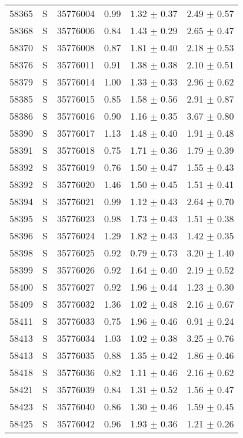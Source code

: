 \begin{longtable*}[c]{cccccc}
58365 & S & 35776004 & 0.99 & 1.32 $\pm$ 0.37 & 2.49 $\pm$ 0.57 \\ 
58368 & S & 35776006 & 0.84 & 1.43 $\pm$ 0.29 & 2.65 $\pm$ 0.47 \\ 
58370 & S & 35776008 & 0.87 & 1.81 $\pm$ 0.40 & 2.18 $\pm$ 0.53 \\ 
58376 & S & 35776011 & 0.91 & 1.38 $\pm$ 0.38 & 2.10 $\pm$ 0.51 \\ 
58379 & S & 35776014 & 1.00 & 1.33 $\pm$ 0.33 & 2.96 $\pm$ 0.62 \\ 
58385 & S & 35776015 & 0.85 & 1.58 $\pm$ 0.56 & 2.91 $\pm$ 0.87 \\ 
58386 & S & 35776016 & 0.90 & 1.16 $\pm$ 0.35 & 3.67 $\pm$ 0.80 \\ 
58390 & S & 35776017 & 1.13 & 1.48 $\pm$ 0.40 & 1.91 $\pm$ 0.48 \\ 
58391 & S & 35776018 & 0.75 & 1.71 $\pm$ 0.36 & 1.79 $\pm$ 0.39 \\ 
58392 & S & 35776019 & 0.76 & 1.50 $\pm$ 0.47 & 1.55 $\pm$ 0.43 \\ 
58392 & S & 35776020 & 1.46 & 1.50 $\pm$ 0.45 & 1.51 $\pm$ 0.41 \\ 
58394 & S & 35776021 & 0.99 & 1.12 $\pm$ 0.43 & 2.64 $\pm$ 0.70 \\ 
58395 & S & 35776023 & 0.98 & 1.73 $\pm$ 0.43 & 1.51 $\pm$ 0.38 \\ 
58396 & S & 35776024 & 1.29 & 1.82 $\pm$ 0.43 & 1.42 $\pm$ 0.35 \\ 
58398 & S & 35776025 & 0.92 & 0.79 $\pm$ 0.73 & 3.20 $\pm$ 1.40 \\ 
58399 & S & 35776026 & 0.92 & 1.64 $\pm$ 0.40 & 2.19 $\pm$ 0.52 \\ 
58400 & S & 35776027 & 0.92 & 1.96 $\pm$ 0.44 & 1.23 $\pm$ 0.30 \\ 
58409 & S & 35776032 & 1.36 & 1.02 $\pm$ 0.48 & 2.16 $\pm$ 0.67 \\ 
58411 & S & 35776033 & 0.75 & 1.96 $\pm$ 0.46 & 0.91 $\pm$ 0.24 \\ 
58413 & S & 35776034 & 1.03 & 1.02 $\pm$ 0.38 & 3.25 $\pm$ 0.76 \\ 
58413 & S & 35776035 & 0.88 & 1.35 $\pm$ 0.42 & 1.86 $\pm$ 0.46 \\ 
58418 & S & 35776036 & 0.82 & 1.11 $\pm$ 0.46 & 2.16 $\pm$ 0.62 \\ 
58421 & S & 35776039 & 0.84 & 1.31 $\pm$ 0.52 & 1.56 $\pm$ 0.47 \\ 
58423 & S & 35776040 & 0.86 & 1.30 $\pm$ 0.46 & 1.59 $\pm$ 0.45 \\ 
58425 & S & 35776042 & 0.96 & 1.93 $\pm$ 0.36 & 1.21 $\pm$ 0.26 \\ 

\end{longtable*}
